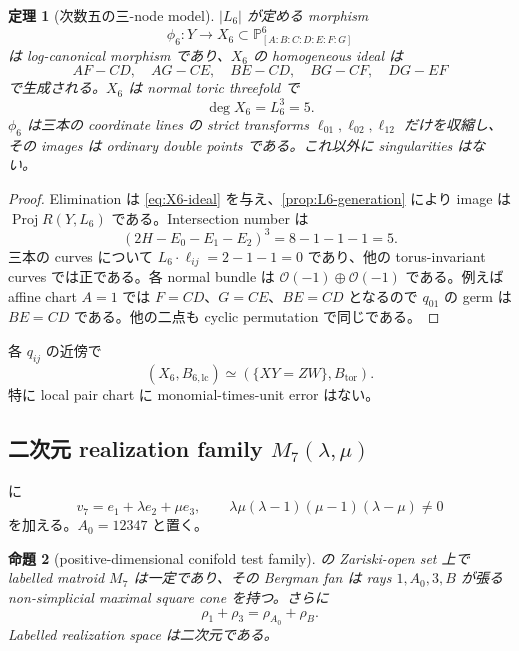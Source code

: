 \documentclass[11pt,a4paper]{ltjsarticle}
\newcommand{\PP}{\mathbb P}\newcommand{\RR}{\mathbb R}\newcommand{\CC}{\mathbb C}
\theoremstyle{plain}
\newtheorem{theorem}{定理}[section]\newtheorem{proposition}[theorem]{命題}
\theoremstyle{definition}
\theoremstyle{remark}
\begin{document}
\begin{theorem}[次数五の三-node model]\label{thm:X6}
$|L_6|$ が定める morphism
\[
 \phi_6:Y\longrightarrow X_6\subset\PP^6_{[A:B:C:D:E:F:G]}
\]
は log-canonical morphism であり、$X_6$ の homogeneous ideal は
\begin{equation}\label{eq:X6-ideal}
 AF-CD,\quad AG-CE,\quad BE-CD,\quad BG-CF,\quad DG-EF
\end{equation}
で生成される。$X_6$ は normal toric threefold で
\[
 \deg X_6=L_6^3=5.
\]
$\phi_6$ は三本の coordinate lines の strict transforms $\ell_{01},\ell_{02},\ell_{12}$ だけを収縮し、その images は ordinary double points である。これ以外に singularities はない。
\end{theorem}

\begin{proof}
Elimination は \cref{eq:X6-ideal} を与え、\cref{prop:L6-generation} により image は $\operatorname{Proj}R(Y,L_6)$ である。Intersection number は
\[
 (2H-E_0-E_1-E_2)^3=8-1-1-1=5.
\]
三本の curves について $L_6\cdot\ell_{ij}=2-1-1=0$ であり、他の torus-invariant curves では正である。各 normal bundle は $\mathcal O(-1)\oplus\mathcal O(-1)$ である。例えば affine chart $A=1$ では $F=CD$、$G=CE$、$BE=CD$ となるので $q_{01}$ の germ は $BE=CD$ である。他の二点も cyclic permutation で同じである。
\end{proof}

\begin{corollary}\label{cor:X6-pairs}
各 $q_{ij}$ の近傍で
\[
 (X_6,B_{6,\mathrm{lc}})\simeq(\{XY=ZW\},B_{\mathrm{tor}}).
\]
特に local pair chart に monomial-times-unit error はない。
\end{corollary}

\subsection{二次元 realization family \texorpdfstring{$M_7(\lambda,\mu)$}{M7(lambda,mu)}}
 に
\begin{equation}\label{eq:M7-column}
 v_7=e_1+\lambda e_2+\mu e_3,
 \qquad
 \lambda\mu(\lambda-1)(\mu-1)(\lambda-\mu)\ne0
\end{equation}
を加える。$A_0=12347$ と置く。

\begin{proposition}[positive-dimensional conifold test family]\label{prop:M7-family}
 の Zariski-open set 上で labelled matroid $M_7$ は一定であり、その Bergman fan は rays $1,A_0,3,B$ が張る non-simplicial maximal square cone を持つ。さらに
\[
 \rho_1+\rho_3=\rho_{A_0}+\rho_B.
\]
Labelled realization space は二次元である。
\end{proposition}
\end{document}
